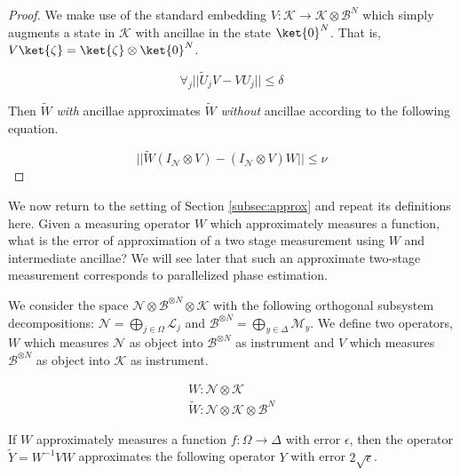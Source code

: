 \begin{proof}
We make use of the standard embedding
$V:\mathcal{K} \rightarrow \mathcal{K} \otimes \mathcal{B}^N$ which simply
augments a state in $\mathcal{K}$ with ancillae in the state $\ket{0}^N$.
That is, $V\ket{\zeta} = \ket{\zeta} \otimes \ket{0}^N$.

\begin{equation}
\forall_j || \tilde{U}_j V - V U_j || \le \delta
\end{equation}

Then $\tilde{W}$ \emph{with} ancillae approximates $\tilde{W}$
\emph{without} ancillae
according to the following equation.

\begin{equation}
|| \tilde{W} (I_{\mathcal{N}} \otimes V) - (I_{\mathcal{N}} \otimes V) W || \le \nu
\end{equation}

\end{proof}

We now return to the setting of Section \ref{subsec:approx} and repeat
its definitions here. Given a measuring operator $W$ which approximately
measures a function, what is the error of approximation
of a two stage measurement using $W$ and intermediate ancillae?
We will see later that such an approximate two-stage measurement
corresponds to parallelized phase estimation.

\begin{theorem}
We consider the space
$\mathcal{N} \otimes \mathcal{B}^{\otimes N} \otimes \mathcal{K}$ with the
following orthogonal subsystem decompositions:
$\mathcal{N} = \bigoplus_{j \in \Omega} \mathcal{L}_j$ and
$\mathcal{B}^{\otimes N} = \bigoplus_{y \in \Delta} \mathcal{M}_y$. We
define two operators, $W$ which measures $\mathcal{N}$ as object into
$\mathcal{B}^{\otimes N}$ as instrument and $V$ which measures
$\mathcal{B}^{\otimes N}$ as object into $\mathcal{K}$ as instrument.

\begin{eqnarray}
W : \mathcal{N} \otimes \mathcal{K}\\
\tilde{W} : \mathcal{N} \otimes \mathcal{K} \otimes \mathcal{B}^N
\end{eqnarray}

If $W$ approximately measures a function $f : \Omega \rightarrow \Delta$
with error $\epsilon$, then the operator $\tilde{Y} = W^{-1}VW$ approximates
the following operator $Y$ with error $2\sqrt{\epsilon}$.

\end{theorem}

